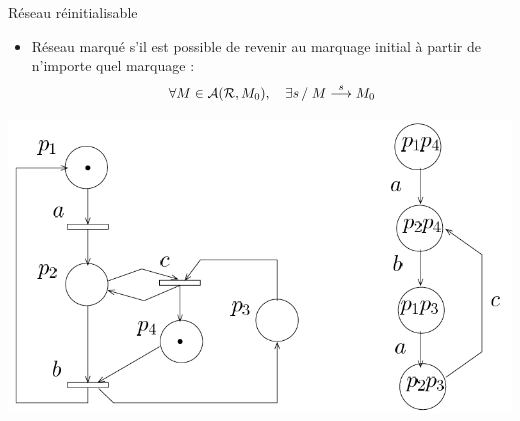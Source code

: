 \documentclass[compress]{beamer}
\begin{document}
\begin{frame}{Réseau réinitialisable}
\begin{itemize}
\item Réseau marqué  s'il est possible de revenir au marquage initial à  partir de n'importe quel marquage :
$$\forall M \in {\cal A(R}, M_0), \quad \exists s \, / \; M \stackrel{s}{\longrightarrow} M_0$$
\end{itemize}
\begin{center}
\includegraphics[width=.7\linewidth]{nonrei-g}
\end{center}
\end{frame}
\end{document}
